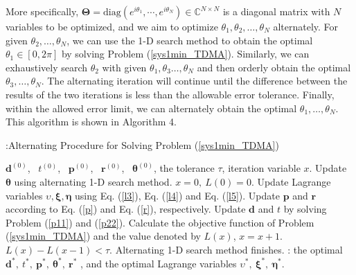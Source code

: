 \documentclass[journal]{IEEEtran}
\begin{document}
More specifically, $\pmb \Theta =\text{diag} (e^{i\theta_{1}}, \cdots, e^{i\theta_{N}})\in\mathbb C^{N\times  N}$ is a diagonal matrix with $N$ variables to be optimized, and we aim to optimize $\theta_1, \theta_2,\dots, \theta_N$ alternately. For given $\theta_2,\dots, \theta_N$, we can use the 1-D search method to obtain the optimal $\theta_1\in [0,2\pi]$ by solving Problem (\ref{sys1min_TDMA}). Similarly, we can exhaustively search $\theta_2$ with given $\theta_1,\theta_3\dots, \theta_N$ and then orderly obtain the optimal $\theta_3,\dots, \theta_N$.
The alternating iteration will continue until the difference between the results of the two iterations is less than the allowable error tolerance.
Finally, within the allowed error limit, we can alternately obtain the optimal $\theta_1,\dots, \theta_N$. This algorithm is shown in Algorithm 4.

\begin{algorithm}[h]
	\caption{:Alternating Procedure for Solving Problem (\ref{sys1min_TDMA})}
	\label{alg:Framwork2}
	\begin{algorithmic}[1]
		\STATE {} $\pmb d^{(0)}$,~ $t^{(0)}$,~ $\pmb p^{(0)}$,~ $\pmb r^{(0)}$,~ $\pmb \theta^{(0)}$, the tolerance $\tau$, iteration variable $x$.
		\REPEAT
		\STATE Update $\pmb \theta$ using alternating 1-D search method.
		\STATE $x=0,~ L(0)=0$.
		\REPEAT
		\STATE Update Lagrange variables $\upsilon,\pmb \xi,\pmb \eta$ using Eq. (\ref{l3}), Eq. (\ref{l4})  and Eq. (\ref{l5}).
		\STATE Update $\pmb p$ and $\pmb r$ according to Eq. (\ref{p}) and Eq. (\ref{r}), respectively.
		\STATE Update $\pmb d$ and $t$ by solving Problem (\ref{p11}) and (\ref{p22}).
		\STATE Calculate the objective function of Problem (\ref{sys1min_TDMA}) and the value denoted by $L(x)$, $x=x+1$.
		\UNTIL $L(x)-L(x-1)<\tau$.
		\UNTIL Alternating 1-D search method finishes.
		\STATE {}: the optimal $\pmb d^*,~ t^*,~ \pmb p^*,~ \pmb \theta^*,~ \pmb r^*$ , and the optimal Lagrange variables $\upsilon^*,~\pmb \xi^*,~\pmb \eta^*$.
	\end{algorithmic}
\end{algorithm}
\end{document}
